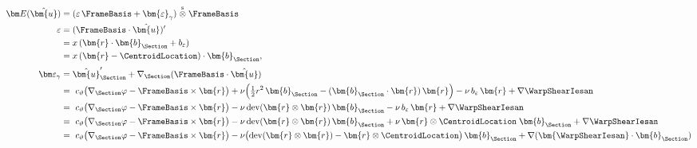 \begin{Details}
\begin{equation*}
\begin{aligned}
\bm E(\hat{\bm{u}})&= (\varepsilon \,\FrameBasis + \bm{\varepsilon}_{\gamma})\stackrel{\rm s}{\otimes}\FrameBasis \\
\varepsilon &= (\FrameBasis\cdot\hat{\bm{u}})' \\
&= x\,(\bm{r}\cdot\bm{b}_{\Section} + b_{\varepsilon}) \\ %
&= x\,(\bm{r}-\CentroidLocation)\cdot\bm{b}_{\Section},\\[2pt]
\bm\varepsilon_\gamma &= \hat{\bm{u}}_{\Section}'+\nabla_{\Section}(\FrameBasis \cdot\hat{\bm{u}})\\
&=\ c_{\vartheta}\big(\nabla_{\Section}\varphi-\FrameBasis\times\bm{r}\big)
+\nu\Big(\tfrac12 r^{2}\,\bm{b}_{\Section}-(\bm{b}_{\Section}\cdot\bm{r})\,\bm{r}\Big)
-\nu\,b_\varepsilon\,\bm{r}
+\nabla \WarpShearIesan \\
&=\ c_{\vartheta}\big(\nabla_{\Section}\varphi-\FrameBasis\times\bm{r}\big)
-\nu\operatorname{dev}(\bm{r}\otimes\bm{r})\,\bm{b}_{\Section}
-\nu\,b_\varepsilon\,\bm{r}
+\nabla \WarpShearIesan \\
&=\ c_{\vartheta}\big(\nabla_{\Section}\varphi-\FrameBasis\times\bm{r}\big)
-\nu\operatorname{dev}(\bm{r}\otimes\bm{r})\,\bm{b}_{\Section}
+\nu\,\bm{r}\otimes\CentroidLocation\;\bm{b}_{\Section}
+\nabla \WarpShearIesan \\
&=\ c_{\vartheta}\big(\nabla_{\Section}\varphi-\FrameBasis\times\bm{r}\big)
-\nu\bigl(\operatorname{dev}(\bm{r}\otimes\bm{r})-\bm{r}\otimes\CentroidLocation \bigr)\,\bm{b}_{\Section}
+\nabla (\bm{\WarpShearIesan}\cdot\bm{b}_{\Section}) \\
\end{aligned}
\end{equation*}


\end{Details}
